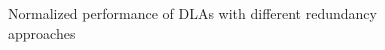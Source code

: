 \begin{figure}
\setlength{\abovecaptionskip}{-10pt}
\setlength{\belowcaptionskip}{-20pt}
    \caption{Normalized performance of DLAs with different redundancy approaches}
\label{fig:ratio}
\vspace{-1em}
\end{figure}

